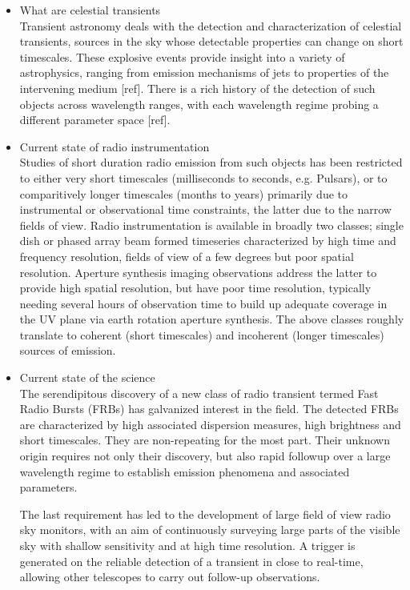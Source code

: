 \documentclass{ws-jai}
\begin{document}
\begin{itemize}
\item What are celestial transients \\
\noindent Transient astronomy deals  with the detection and  characterization of celestial
transients, sources in  the sky whose detectable properties can  change on short
timescales.   These  explosive   events  provide  insight  into   a  variety  of
astrophysics,  ranging from  emission mechanisms  of jets  to properties  of the
intervening  medium [ref].  There is  a rich  history of  the detection  of such
objects  across  wavelength  ranges,  with  each  wavelength  regime  probing  a
different parameter space [ref].

\item Current  state of  radio instrumentation\\
Studies of short  duration radio emission from such objects  has been restricted
to either very  short timescales (milliseconds to seconds, e.g.  Pulsars), or to
comparitively longer timescales (months to  years) primarily due to instrumental
or observational time constraints, the latter  due to the narrow fields of view.
Radio instrumentation is available in broadly two classes; single dish or phased
array  beam  formed   timeseries  characterized  by  high   time  and  frequency
resolution,  fields of  view  of  a few  degrees  but  poor spatial  resolution.
Aperture  synthesis imaging  observations  address the  latter  to provide  high
spatial resolution,  but have  poor time  resolution, typically  needing several
hours of  observation time  to build up  adequate coverage in  the UV  plane via
earth  rotation aperture  synthesis.   The above  classes  roughly translate  to
coherent  (short  timescales)  and  incoherent (longer  timescales)  sources  of
emission.

\item Current state of the science \\
The serendipitous discovery of a new  class of radio transient termed Fast Radio
Bursts  (FRBs) has  galvanized  interest in  the field.  The  detected FRBs  are
characterized by high associated dispersion  measures, high brightness and short
timescales.  They are  non-repeating for  the  most part.  Their unknown  origin
requires  not  only their  discovery,  but  also  rapid  followup over  a  large
wavelength regime to establish emission phenomena and associated parameters.

The last requirement has led to the development of large field of view radio sky
monitors, with an  aim of continuously surveying large parts  of the visible sky
with shallow sensitivity and at high  time resolution. A trigger is generated on
the reliable  detection of  a transient  in close  to real-time,  allowing other
telescopes to carry out follow-up observations.


\end{itemize}
\end{document}
